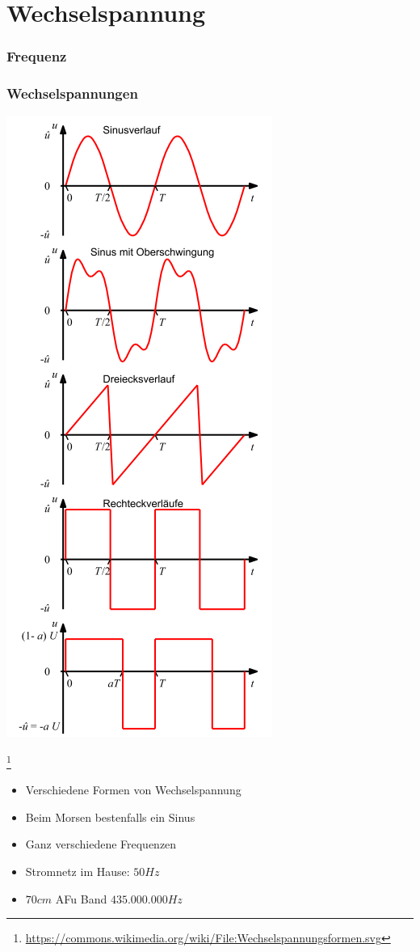 \section*{Wechsel\-spannung}
\begin{frame}
\frametitle{Frequenz}

\end{frame}
\begin{frame}
    \frametitle{Wechselspannungen}
	\begin{minipage}{0.4\textwidth}
        \includegraphics[width=.5\textwidth]{e02/Wechselspannungsformen.png}
	\end{minipage}
	\footnote{\tiny \url{https://commons.wikimedia.org/wiki/File:Wechselspannungsformen.svg}}
	\begin{minipage}{0.4\textwidth}	
	\begin{itemize}
		\item Verschiedene Formen von Wechselspannung
		\item Beim Morsen bestenfalls ein Sinus
		\item Ganz verschiedene Frequenzen
		\item Stromnetz im Hause: $50Hz$ 
		\item $70cm$ AFu Band $435.000.000Hz$
	\end{itemize}
	\end{minipage}
\end{frame}

